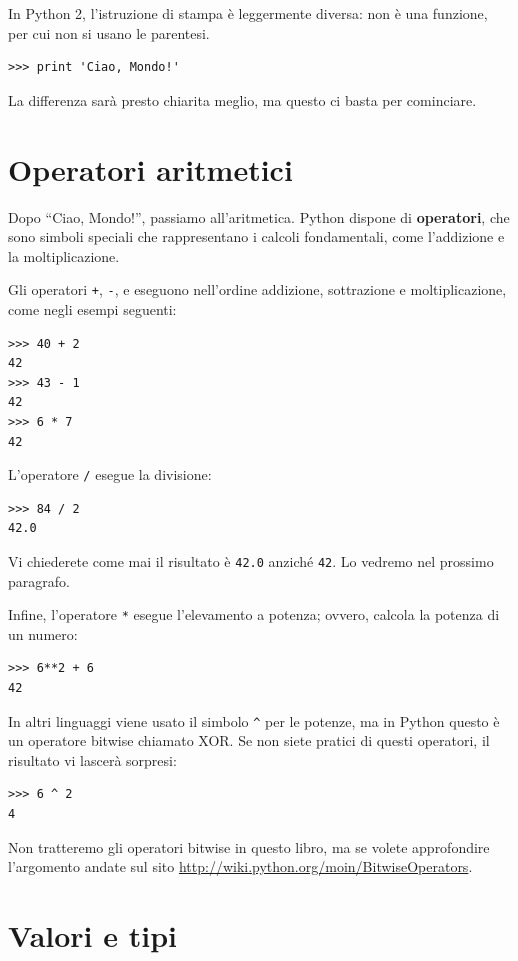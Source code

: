 \documentclass[10pt]{book}
\begin{document}
In Python 2, l'istruzione di stampa è leggermente diversa: non è una funzione, per cui non si usano le parentesi.
\begin{verbatim}
>>> print 'Ciao, Mondo!'
\end{verbatim}
%
La differenza sarà presto chiarita meglio, ma questo ci basta per cominciare.

\section{Operatori aritmetici}

Dopo ``Ciao, Mondo!'', passiamo all'aritmetica. Python dispone di
{\bf operatori}, che sono simboli speciali che rappresentano i calcoli fondamentali, come l'addizione e la moltiplicazione.

Gli operatori {\tt +}, {\tt -}, e {\tt *} eseguono nell'ordine addizione, sottrazione e moltiplicazione, come negli esempi seguenti:

\begin{verbatim}
>>> 40 + 2
42
>>> 43 - 1
42
>>> 6 * 7
42
\end{verbatim}
%
L'operatore {\tt /} esegue la divisione:

\begin{verbatim}
>>> 84 / 2
42.0
\end{verbatim}
%
Vi chiederete come mai il risultato è {\tt 42.0} anziché {\tt 42}.
Lo vedremo nel prossimo paragrafo.

Infine, l'operatore {\tt **} esegue l'elevamento a potenza; ovvero, calcola la potenza di un numero:

\begin{verbatim}
>>> 6**2 + 6
42
\end{verbatim}
%
In altri linguaggi viene usato il simbolo \verb"^" per le potenze, ma in Python questo è un operatore bitwise chiamato XOR.  Se non siete pratici di questi operatori, il risultato vi lascerà sorpresi:

\begin{verbatim}
>>> 6 ^ 2
4
\end{verbatim}
%
Non tratteremo gli operatori bitwise in questo libro, ma se volete approfondire l'argomento andate sul sito \url{http://wiki.python.org/moin/BitwiseOperators}.

\section{Valori e tipi}
\end{document}
